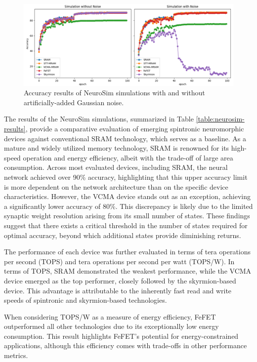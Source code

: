 \documentclass[conference]{IEEEtran}
\begin{document}
\begin{figure}
    \centering
    \includegraphics[width=1\linewidth]{Figure_1.png}
    \caption{Accuracy results of NeuroSim simulations with and without artificially-added Gaussian noise.}
    \label{fig:noise}
\end{figure}

The results of the NeuroSim simulations, summarized in Table \ref{table:neurosim-results}, provide a comparative evaluation of emerging spintronic neuromorphic devices against conventional SRAM technology, which serves as a baseline. As a mature and widely utilized memory technology, SRAM is renowned for its high-speed operation and energy efficiency, albeit with the trade-off of large area consumption. Across most evaluated devices, including SRAM, the neural network achieved over 90\% accuracy, highlighting that this upper accuracy limit is more dependent on the network architecture than on the specific device characteristics. However, the VCMA device stands out as an exception, achieving a significantly lower accuracy of 80\%. This discrepancy is likely due to the limited synaptic weight resolution arising from its small number of states. These findings suggest that there exists a critical threshold in the number of states required for optimal accuracy, beyond which additional states provide diminishing returns.

The performance of each device was further evaluated in terms of tera operations per second (TOPS) and tera operations per second per watt (TOPS/W). In terms of TOPS, SRAM demonstrated the weakest performance, while the VCMA device emerged as the top performer, closely followed by the skyrmion-based device. This advantage is attributable to the inherently fast read and write speeds of spintronic and skyrmion-based technologies.

When considering TOPS/W as a measure of energy efficiency, FeFET outperformed all other technologies due to its exceptionally low energy consumption. This result highlights FeFET’s potential for energy-constrained applications, although this efficiency comes with trade-offs in other performance metrics.
\end{document}
